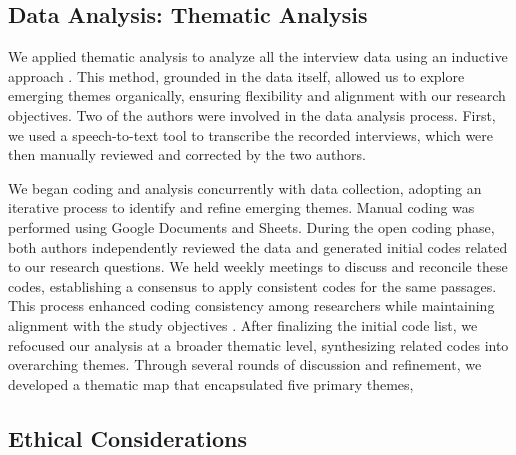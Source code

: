 \subsection{Data Analysis: Thematic Analysis}

We applied thematic analysis \cite{braun2012thematic} to analyze all the interview data using an inductive approach \cite{patton1990qualitative}. This method, grounded in the data itself, allowed us to explore emerging themes organically, ensuring flexibility and alignment with our research objectives. Two of the authors were involved in the data analysis process. First, we used a speech-to-text tool to transcribe the recorded interviews, which were then manually reviewed and corrected by the two authors.

We began coding and analysis concurrently with data collection, 
adopting an iterative process to identify and refine emerging themes. Manual coding was performed using Google Documents and Sheets. During the open coding phase, both authors independently reviewed the data and generated initial codes related to our research questions. We held weekly meetings to discuss and reconcile these codes, establishing a consensus to apply consistent codes for the same passages. This process enhanced coding consistency among researchers while maintaining alignment with the study objectives \cite{creswell2017research}.
After finalizing the initial code list, we refocused our analysis at a broader thematic level, synthesizing related codes into overarching themes. Through several rounds of discussion and refinement, we developed a thematic map that encapsulated five primary themes, 

\subsection{Ethical Considerations}

